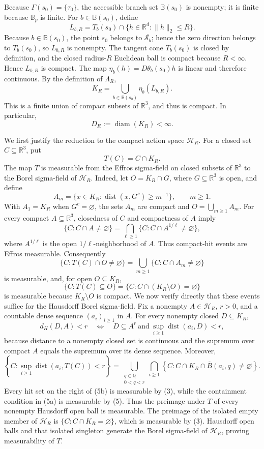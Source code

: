 Because \(\Gamma(s_0)=\{\tau_0\}\), the accessible branch set \(\mathbb B(s_0)\) is nonempty; it is finite because \(\mathbb B_p\) is finite.  For \(b\in\mathbb B(s_0)\), define
\[
 L_{b,R}=T_b(s_0)\cap\{h\in\mathbb R^d:\|h\|_2\le R\}.
\]
Because \(b\in\mathbb B(s_0)\), the point \(s_0\) belongs to \(\overline{\mathcal S_b}\); hence the zero direction belongs to \(T_b(s_0)\), so \(L_{b,R}\) is nonempty.  The tangent cone \(T_b(s_0)\) is closed by definition, and the closed radius-\(R\) Euclidean ball is compact because \(R<\infty\).  Hence \(L_{b,R}\) is compact.  The map \(\eta_b(h)=D\theta_b(s_0)h\) is linear and therefore continuous.  By the definition of \(\Lambda_R\),
\[
 K_R=\bigcup_{b\in\mathbb B(s_0)}\eta_b(L_{b,R}).
\]
This is a finite union of compact subsets of \(\mathbb R^3\), and thus is compact.  In particular,
\[
 D_R:=\operatorname{diam}(K_R)<\infty.
\tag{1}
\]

We first justify the reduction to the compact action space \(\mathcal H_R\).  For a closed set \(C\subseteq\mathbb R^3\), put
\[
 T(C)=C\cap K_R.
\tag{2}
\]
The map \(T\) is measurable from the Effros sigma-field on closed subsets of \(\mathbb R^3\) to the Borel sigma-field of \(\mathcal H_R\).  Indeed, let \(O=K_R\cap G\), where \(G\subseteq\mathbb R^3\) is open, and define
\[
 A_m=\{x\in K_R:\operatorname{dist}(x,G^c)\ge m^{-1}\},\qquad m\ge1.
\]
With \(A_1=K_R\) when \(G^c=\varnothing\), the sets \(A_m\) are compact and \(O=\bigcup_{m\ge1}A_m\).  For every compact \(A\subseteq\mathbb R^3\), closedness of \(C\) and compactness of \(A\) imply
\[
 \{C:C\cap A\ne\varnothing\}
 =\bigcap_{\ell\ge1}\{C:C\cap A^{1/\ell}\ne\varnothing\},
\tag{3}
\]
where \(A^{1/\ell}\) is the open \(1/\ell\)-neighborhood of \(A\).  Thus compact-hit events are Effros measurable.  Consequently
\[
 \{C:T(C)\cap O\ne\varnothing\}
 =\bigcup_{m\ge1}\{C:C\cap A_m\ne\varnothing\}
\tag{4}
\]
is measurable, and, for open \(O\subseteq K_R\),
\[
 \{C:T(C)\subseteq O\}
 =\{C:C\cap(K_R\setminus O)=\varnothing\}
\tag{5}
\]
is measurable because \(K_R\setminus O\) is compact.  We now verify directly that these events suffice for the Hausdorff Borel sigma-field.  Fix a nonempty \(A\in\mathcal H_R\), \(r>0\), and a countable dense sequence \((a_i)_{i\ge1}\) in \(A\).  For every nonempty closed \(D\subseteq K_R\),
\[
 d_H(D,A)<r
 \quad\Longleftrightarrow\quad
 D\subseteq A^r
 \ \text{and}\ 
 \sup_{i\ge1}\operatorname{dist}(a_i,D)<r,
\tag{5a}
\]
because distance to a nonempty closed set is continuous and the supremum over compact \(A\) equals the supremum over its dense sequence.  Moreover,
\[
 \left\{C:\sup_{i\ge1}\operatorname{dist}(a_i,T(C))<r\right\}
 =\bigcup_{\substack{q\in\mathbb Q\\0<q<r}}
   \bigcap_{i\ge1}
   \left\{C:C\cap K_R\cap\overline B(a_i,q)\ne\varnothing\right\}.
\tag{5b}
\]
Every hit set on the right of (5b) is measurable by (3), while the containment condition in (5a) is measurable by (5).  Thus the preimage under \(T\) of every nonempty Hausdorff open ball is measurable.  The preimage of the isolated empty member of \(\mathcal H_R\) is \(\{C:C\cap K_R=\varnothing\}\), which is measurable by (3).  Hausdorff open balls and that isolated singleton generate the Borel sigma-field of \(\mathcal H_R\), proving measurability of \(T\).

